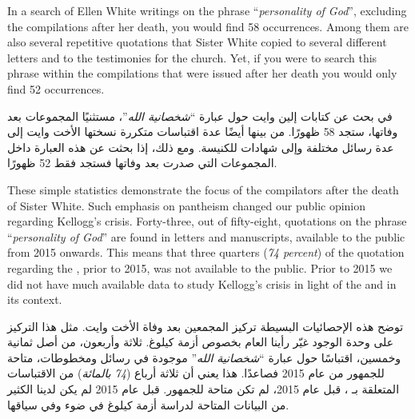 In a search of Ellen White writings on the phrase “\textit{personality of God}”, excluding the compilations after her death, you would find 58 occurrences. Among them are also several repetitive quotations that Sister White copied to several different letters and to the testimonies for the church. Yet, if you were to search this phrase within the compilations that were issued after her death you would only find 52 occurrences.


في بحث عن كتابات إلين وايت حول عبارة “\textit{شخصانية الله}”، مستثنيًا المجموعات بعد وفاتها، ستجد 58 ظهورًا. من بينها أيضًا عدة اقتباسات متكررة نسختها الأخت وايت إلى عدة رسائل مختلفة وإلى شهادات للكنيسة. ومع ذلك، إذا بحثت عن هذه العبارة داخل المجموعات التي صدرت بعد وفاتها فستجد فقط 52 ظهورًا.


These simple statistics demonstrate the focus of the compilators after the death of Sister White. Such emphasis on pantheism changed our public opinion regarding Kellogg’s crisis. Forty-three, out of fifty-eight, quotations on the phrase “\textit{personality of God}” are found in letters and manuscripts, available to the public from 2015 onwards. This means that three quarters (\textit{74 percent}) of the quotation regarding the , prior to 2015, was not available to the public. Prior to 2015 we did not have much available data to study Kellogg's crisis in light of the  and in its context.


توضح هذه الإحصائيات البسيطة تركيز المجمعين بعد وفاة الأخت وايت. مثل هذا التركيز على وحدة الوجود غيّر رأينا العام بخصوص أزمة كيلوغ. ثلاثة وأربعون، من أصل ثمانية وخمسين، اقتباسًا حول عبارة “\textit{شخصانية الله}” موجودة في رسائل ومخطوطات، متاحة للجمهور من عام 2015 فصاعدًا. هذا يعني أن ثلاثة أرباع (\textit{74 بالمائة}) من الاقتباسات المتعلقة بـ ، قبل عام 2015، لم تكن متاحة للجمهور. قبل عام 2015 لم يكن لدينا الكثير من البيانات المتاحة لدراسة أزمة كيلوغ في ضوء  وفي سياقها.



